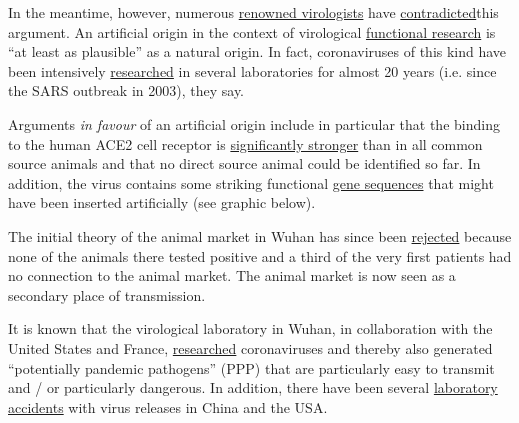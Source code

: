 In the meantime, however, numerous
\href{https://www.independentsciencenews.org/health/the-case-is-building-that-covid-19-had-a-lab-origin/}{renowned
virologists} have
\href{https://gmwatch.org/en/news/latest-news/19412-lab-escape-theory-of-sars-cov-2-origin-gaining-scientific-support}{contradicted}this
argument. An artificial origin in the context of virological
\href{https://medium.com/\%40yurideigin/lab-made-cov2-genealogy-through-the-lens-of-gain-of-function-research-f96dd7413748}{functional
research} is ``at least as plausible'' as a natural origin. In fact,
coronaviruses of this kind have been intensively
\href{https://gmwatch.org/en/news/latest-news/19410-chinese-and-us-scientists-genetically-engineered-bat-coronaviruses-in-dangerous-gain-of-function-research-stretching-back-years}{researched}
in several laboratories for almost 20 years (i.e. since the SARS
outbreak in 2003), they say.

Arguments \emph{in favour} of an artificial origin include in particular
that the binding to the human ACE2 cell receptor is
\href{https://arxiv.org/abs/2005.06199}{significantly stronger} than in
all common source animals and that no direct source animal could be
identified so far. In addition, the virus contains some striking
functional
\href{https://gmwatch.org/en/news/latest-news/19403-wuhan-and-us-scientists-used-undetectable-methods-of-genetic-engineering-on-bat-coronaviruses}{gene
sequences} that might have been inserted artificially (see graphic
below).

The initial theory of the animal market in Wuhan has since been
\href{https://thebulletin.org/2020/06/did-the-sars-cov-2-virus-arise-from-a-bat-coronavirus-research-program-in-a-chinese-laboratory-very-possibly}{rejected}
because none of the animals there tested positive and a third of the
very first patients had no connection to the animal market. The animal
market is now seen as a secondary place of transmission.

It is known that the virological laboratory in Wuhan, in collaboration
with the United States and France,
\href{https://www.newsweek.com/dr-fauci-backed-controversial-wuhan-lab-millions-us-dollars-risky-coronavirus-research-1500741}{researched}
coronaviruses and thereby also generated ``potentially pandemic
pathogens'' (PPP) that are particularly easy to transmit and / or
particularly dangerous. In addition, there have been several
\href{https://www.independentsciencenews.org/health/the-long-history-of-accidental-laboratory-releases-of-potential-pandemic-pathogens/}{laboratory
accidents} with virus releases in China and the USA.

